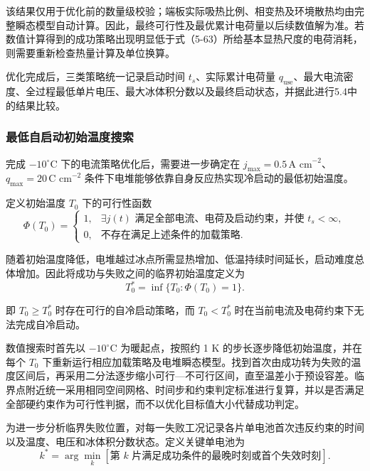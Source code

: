 \documentclass[bwprint]{gmcmthesis}
\numberwithin{figure}{section}
\begin{document}
\begin{itemize}
\noindent 该结果仅用于优化前的数量级校验；端板实际吸热比例、相变热及环境散热均由完整瞬态模型自动计算。因此，最终可行性及最优累计电荷量以后续数值解为准。若数值计算得到的成功策略出现明显低于式（5-63）所给基本显热尺度的电荷消耗，则需要重新检查热量计算及单位换算。

\noindent 优化完成后，三类策略统一记录启动时间 \(t_s\)、实际累计电荷量 \(q_{\text{use}}\)、最大电流密度、全过程最低单片电压、最大冰体积分数以及最终启动状态，并据此进行5.4中的结果比较。

\end{itemize}


\subsubsection{最低自启动初始温度搜索}

\noindent 完成 \(-10^\circ\text{C}\) 下的电流策略优化后，需要进一步确定在 \(j_{\text{max}} = 0.5 \, \text{A cm}^{-2}\)、\(q_{\text{max}} = 20 \, \text{C cm}^{-2}\) 条件下电堆能够依靠自身反应热实现冷启动的最低初始温度。

\noindent 定义初始温度 \(T_0\) 下的可行性函数
\begin{equation}
\Phi(T_0) = \begin{cases}
1, & \exists j(t) \text{ 满足全部电流、电荷及启动约束，并使 } t_s < \infty, \\
0, & \text{不存在满足上述条件的加载策略.}
\end{cases} \tag{5-65}
\end{equation}

\noindent 随着初始温度降低，电堆越过冰点所需显热增加、低温持续时间延长，启动难度总体增加。因此将成功与失败之间的临界初始温度定义为
\begin{equation}
T_0^* = \inf \{T_0 : \Phi(T_0) = 1\}. \tag{5-66}
\end{equation}

\noindent 即 \(T_0 \geq T_0^*\) 时存在可行的自冷启动策略，而 \(T_0 < T_0^*\) 时在当前电流及电荷约束下无法完成自冷启动。

\noindent 数值搜索时首先以 \(-10^\circ\text{C}\) 为暖起点，按照约 1 K 的步长逐步降低初始温度，并在每个 \(T_0\) 下重新运行相应加载策略及电堆瞬态模型。找到首次由成功转为失败的温度区间后，再采用二分法逐步缩小可行—不可行区间，直至温差小于预设容差。临界点附近统一采用相同空间网格、时间步和约束判定标准进行复算，并以是否满足全部硬约束作为可行性判据，而不以优化目标值大小代替成功判定。

\noindent 为进一步分析临界失败位置，对每一失败工况记录各片单电池首次违反约束的时间以及温度、电压和冰体积分数状态。定义关键单电池为
\begin{equation}
k^* = \arg\min_k [\text{第 } k \text{ 片满足成功条件的最晚时刻或首个失效时刻}]. \tag{5-67}
\end{equation}
\end{document}
